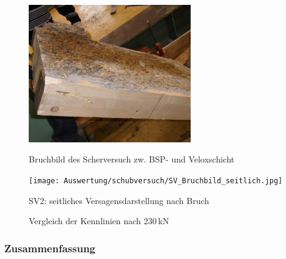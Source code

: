 \begin{figure}[h!]
\begin{minipage}[hbt]{7cm}	
	\includegraphics[width=7cm]{Auswertung/1versuch/bruchbild1_scherversuch.png}
	\caption{Bruchbild des Scherversuch zw. BSP- und Veloxschicht}
	\label{abb:SV_Bruchbild_Oberfläche}
\end{minipage}
\hfill
\begin{minipage}[hbt]{7cm}
\texttt{[image: Auswertung/schubversuch/SV\_Bruchbild\_seitlich.jpg]}
	\caption{SV2: seitliches Versagensdarstellung nach Bruch}
	\label{abb:bruchbild_scherversuch}
\end{minipage}
\end{figure}


\begin{figure}[h!]
\begin{center}

\caption{Vergleich der Kennlinien nach 230\,kN}
\label{abb:VergleichSchubersuch230}
\end{center}
\end{figure}




\subsubsection{Zusammenfassung}

